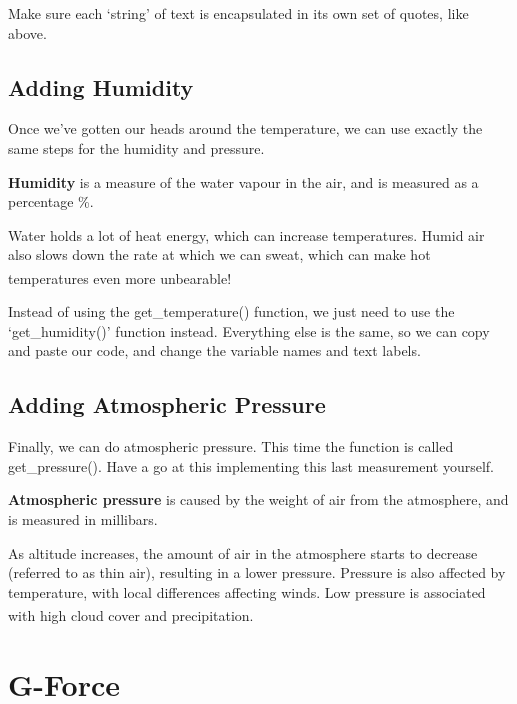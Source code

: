 \documentclass[a4paper, twocolumn, twoside, 12pt]{article}
\newenvironment{aside}
		{
		\begin{mdframed}[
			style=0,%
			leftline=false,
			rightline=false,
			innerbottommargin=2pt,
			innerleftmargin=12pt,
			innerrightmargin=0pt,
			linewidth=0.75pt,
			skipabove=6pt,
			skipbelow=6pt
			]
				\small
				\color{JungleGreen}
				\setlength{\parskip}{2pt}
				\vspace{2pt} %
		}
		{
		\end{mdframed}
		}
\begin{document}
		Make sure each `string' of text is encapsulated in its own set of quotes, like above.
		
		\subsection*{Adding Humidity}
		
		Once we've gotten our heads around the temperature, we can use exactly the same steps for the humidity and pressure.
		
		\begin{aside}
			\textbf{Humidity} is a measure of the water vapour in the air, and is measured as a percentage \%.
			
			Water holds a lot of heat energy, which can increase temperatures. Humid air also slows down the rate at which we can sweat, which can make hot temperatures even more unbearable!\textsuperscript{\cite{humidity}}
		\end{aside}
		
		Instead of using the get\_temperature() function, we just need to use the `get\_humidity()' function instead. Everything else is the same, so we can copy and paste our code, and change the variable names and text labels.
		
		

		\subsection*{Adding Atmospheric Pressure}		
		Finally, we can do atmospheric pressure. This time the function is called get\_pressure(). Have a go at this implementing this last measurement yourself.
		\begin{aside}
			\textbf{Atmospheric pressure} is caused by the weight of air from the atmosphere, and is measured in millibars.
			
			As altitude increases, the amount of air in the atmosphere starts to decrease (referred to as thin air), resulting in a lower pressure. Pressure is also affected by temperature, with local differences affecting winds. Low pressure is associated with high cloud cover and precipitation.
			\textsuperscript{\cite{pressure}}
		\end{aside}
		
	\section{G-Force}
	
\end{document}
